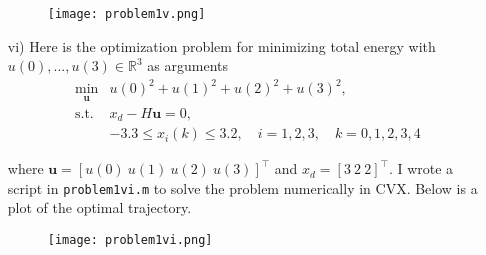 \begin{homeworkProblem}
\begin{solution}
\begin{itemize}
                \begin{figure}[h!] %
                    \centering
                    \texttt{[image: problem1v.png]}
                \end{figure}

            \pagebreak

            \item[vi)] Here is the optimization problem for minimizing total 
                energy with $u(0),..., u(3) \in \mathbb{R}^3$ as arguments
                \[
                    \begin{array}{rl}
                        \min\limits_{\boldsymbol{u}} & u(0)^2 + u(1)^2 + u(2)^2 + u(3)^2, \\ [2ex]
                        \text{s.t.} & x_d - H \boldsymbol{u} = 0, \\ [1ex]
                        & -3.3 \leq x_i(k) \leq 3.2, \quad i=1,2,3, \quad k=0,1,2,3,4
                    \end{array}
                \]

                where $\boldsymbol{u} = [u(0) \ u(1) \ u(2) \ u(3)]^\top$ and
                $x_d = [3 \ 2 \ 2]^\top$. I wrote a script in \texttt{problem1vi.m}
                to solve the problem numerically in CVX. Below is a plot of the
                optimal trajectory.

                \begin{figure}[h!] %
                    \centering
                    \texttt{[image: problem1vi.png]}
                \end{figure}

        \end{itemize}

    \end{solution}

\end{homeworkProblem}